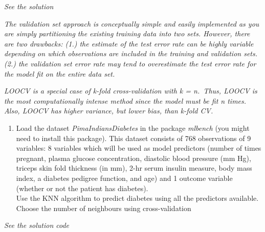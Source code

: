 \documentclass[
]{book}
\providecommand{\tightlist}{%
  \setlength{\itemsep}{0pt}\setlength{\parskip}{0pt}}
\begin{document}
\emph{See the solution}

\emph{The validation set approach is conceptually simple and easily implemented as you are simply partitioning the existing training data into two sets. However, there are two drawbacks: (1.) the estimate of the test error rate can be highly variable depending on which observations are included in the training and validation sets. (2.) the validation set error rate may tend to overestimate the test error rate for the model fit on the entire data set.}

\emph{LOOCV is a special case of k-fold cross-validation with k = n.~Thus, LOOCV is the most computationally intense method since the model must be fit n times. Also, LOOCV has higher variance, but lower bias, than k-fold CV.}

\begin{enumerate}
\def\labelenumi{\arabic{enumi})}
\setcounter{enumi}{1}
\tightlist
\item
  Load the dataset \emph{PimaIndiansDiabetes} in the package \emph{mlbench} (you might need
  to install this package). This dataset consists of 768 observations
  of 9 variables: 8 variables which will be used as model
  predictors (number of times pregnant, plasma glucose concentration, diastolic blood pressure (mm Hg), triceps skin fold thickness (in mm), 2-hr serum insulin measure, body mass index, a diabetes pedigree function, and age) and 1 outcome variable (whether or not the patient has diabetes).\\
  Use the KNN algorithm to predict diabetes using all the predictors available.
  Choose the number of neighbours using cross-validation
\end{enumerate}

\emph{See the solution code}
\end{document}
